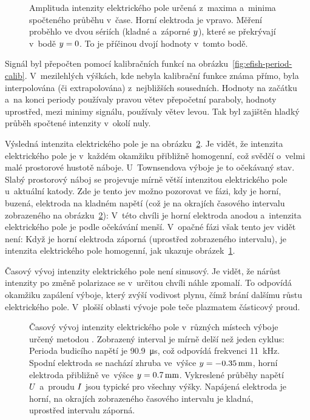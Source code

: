 \begin{figure}[htp]
	\centering
	
	\caption{Amplituda intenzity elektrického pole určená z~maxima
		a~minima spočteného průběhu v~čase.
		Horní elektroda je vpravo.
		Měření proběhlo ve dvou sériích (kladné a~záporné $y$),
		které se překrývají v~bodě $y = 0$.
		To je příčinou dvojí hodnoty v~tomto bodě.}
	\label{fig:efish-period-amplitude}
\end{figure}

Signál byl přepočten pomocí kalibračních funkcí
na obrázku~\ref{fig:efish-period-calib}.
V~mezilehlých výškách, kde nebyla kalibrační funkce známa přímo,
byla interpolována (či extrapolována) z~nejbližších sousedních.
Hodnoty na začátku a~na konci periody používaly pravou větev
přepočetní paraboly,
hodnoty uprostřed, mezi minimy signálu, používaly větev levou.
Tak byl zajištěn hladký průběh spočtené intenzity v~okolí nuly.

Výsledná intenzita elektrického pole je na
obrázku~\ref{fig:efish-period-elfield}.
Je vidět, že intenzita elektrického pole je v~každém okamžiku
přibližně homogenní, což svědčí o~velmi malé prostorové hustotě náboje.
U~Townsendova výboje je to očekávaný stav.
Slabý prostorový náboj se projevuje mírně větší intenzitou
elektrického pole u~aktuální katody.
Zde je tento jev možno pozorovat ve fázi, kdy je horní, buzená, elektroda
na kladném napětí (což je na okrajích časového intervalu
zobrazeného na obrázku~\ref{fig:efish-period-elfield}):
V~této chvíli je horní elektroda anodou a~intenzita elektrického
pole je podle očekávání menší.
V~opačné fázi však tento jev vidět není:
Když je horní elektroda záporná (uprostřed zobrazeného intervalu),
je intenzita elektrického pole homogenní,
jak ukazuje obrázek~\ref{fig:efish-period-amplitude}.

Časový vývoj intenzity elektrického pole není sinusový.
Je vidět, že nárůst intenzity po změně polarizace se v~určitou
chvíli náhle zpomalí.
To odpovídá okamžiku zapálení výboje, který zvýší vodivost plynu,
čímž brání dalšímu růstu elektrického pole.
V~plošší oblasti vývoje pole teče plazmatem částicový proud.

\begin{figure}[hbp]
	
	\caption{Časový vývoj intenzity elektrického pole v~různých místech výboje
		určený metodou \EFISH{}.
		Zobrazený interval je mírně delší než jeden cyklus:
		Perioda budicího napětí je \SI{90.9}{\micro\second},
		což odpovídá frekvenci \SI{11}{\kilo\hertz}.
		Spodní elektroda se nachází zhruba ve~výšce
		$y = \SI{-0.35}{\milli\metre}$,
		horní elektroda přibližně ve~výšce
		$y = \SI{0.7}{\milli\metre}$.
		Vykreslené průběhy napětí $U$ a~proudu $I$
		jsou typické pro všechny výšky.
		Napájená elektroda je horní, na okrajích zobrazeného časového
		intervalu je kladná, uprostřed intervalu záporná.}
	\label{fig:efish-period-elfield}
\end{figure}
